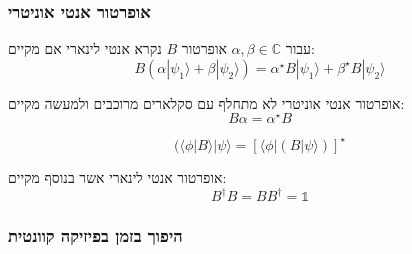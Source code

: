 \documentclass{tstextbook}
\begin{document}
\subsubsection{אופרטור אנטי אוניטרי}

\begin{definition}
עבור \(\alpha,\beta \in \mathbb{C}\) אופרטור \(B\) נקרא אנטי לינארי אם מקיים:
$$B(\alpha|\psi_{1}\rangle+\beta|\psi_{2}\rangle)=\alpha^{\star}B|\psi_{1}\rangle+\beta^{\star}B|\psi_{2}\rangle$$

\end{definition}
\begin{corollary}
אופרטור אנטי אוניטרי לא מתחלף עם סקלארים מרוכבים ולמעשה מקיים:
$$B\alpha=\alpha^{\star}B$$

\end{corollary}
\begin{definition}
$$(\langle\phi|B\rangle|\psi\rangle=[\langle\phi|(B|\psi\rangle)]^{\star}$$

\end{definition}
\begin{definition}
אופרטור אנטי לינארי אשר בנוסף מקיים:
$$B^{\dagger}B=B B^{\dagger}=\mathbb{1} $$

\end{definition}
\subsubsection{היפוך בזמן בפיזיקה קוונטית}
\end{document}
